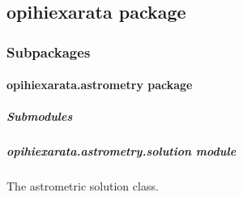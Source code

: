 \documentclass[letterpaper,11pt,english]{sphinxmanual}
\begin{document}
\subsection{opihiexarata package}
\label{\detokenize{code/opihiexarata:opihiexarata-package}}\label{\detokenize{code/opihiexarata::doc}}

\subsubsection{Subpackages}
\label{\detokenize{code/opihiexarata:subpackages}}
\sphinxstepscope


\paragraph{opihiexarata.astrometry package}
\label{\detokenize{code/opihiexarata.astrometry:opihiexarata-astrometry-package}}\label{\detokenize{code/opihiexarata.astrometry::doc}}

\subparagraph{Submodules}
\label{\detokenize{code/opihiexarata.astrometry:submodules}}
\sphinxstepscope


\subparagraph{opihiexarata.astrometry.solution module}
\label{\detokenize{code/opihiexarata.astrometry.solution:module-opihiexarata.astrometry.solution}}\label{\detokenize{code/opihiexarata.astrometry.solution:opihiexarata-astrometry-solution-module}}\label{\detokenize{code/opihiexarata.astrometry.solution::doc}}
\sphinxAtStartPar
The astrometric solution class.
\end{document}
